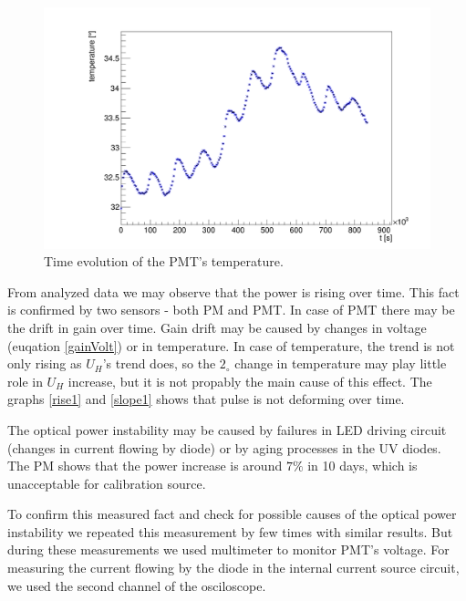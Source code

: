 \begin{figure}[H]
 \centering
 \includegraphics[scale=0.3]{./pictures/temperatures}
 \caption{Time evolution of the PMT's temperature.}
 \label{temp1}
\end{figure}

From analyzed data we may observe that the power is rising over time. This fact is confirmed by two sensors - both PM and PMT. In case of PMT there may be the drift in gain over time. Gain drift may be caused by changes in voltage (euqation \ref{gainVolt}) or in temperature. In case of temperature, the trend is not only rising as $U_{H}$'s trend does, so the $2_{\circ}$ change in temperature may play little role in $U_{H}$ increase, but it is not propably the main cause of this effect.
The graphs \ref{rise1} and \ref{slope1} shows that pulse is not deforming over time.
\par
The optical power instability may be caused by failures in LED driving circuit (changes in current flowing by diode) or by aging processes in the UV diodes. The PM shows that the power increase is around $7 \%$ in 10 days, which is unacceptable for calibration source. 
\par
To confirm this measured fact and check for possible causes of the optical power instability we repeated this measurement by few times with similar results. But during these measurements we used multimeter to monitor PMT's voltage. For measuring the current flowing by the diode in the internal current source circuit, we used the second channel of the osciloscope.

